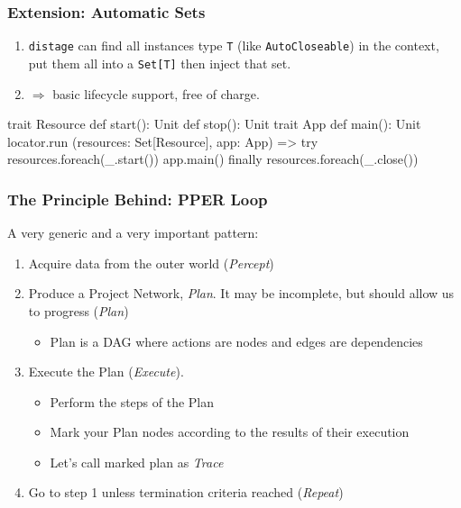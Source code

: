 \documentclass[usenames,dvipsnames]{beamer}
\newcommand{\distage}{\texttt{distage}\xspace}
\begin{document}
\begin{frame}[fragile]
\frametitle{Extension: Automatic Sets}

\begin{enumerate}
\item \distage can find all instances type \texttt{T} (like \texttt{AutoCloseable}) in the context,
put them all into a \texttt{Set[T]} then inject that set.
\item $\Rightarrow$ basic lifecycle support, free of charge.
\end{enumerate}

\begin{scalacode}
trait Resource {
  def start(): Unit
  def stop(): Unit
}
trait App { def main(): Unit }
locator.run { (resources: Set[Resource], app: App) =>
  try {
    resources.foreach(_.start())
    app.main()
  } finally {
    resources.foreach(_.close())
  }
}
\end{scalacode}
\end{frame}

\begin{frame}
    \frametitle{The Principle Behind: PPER Loop\footnotemark[1]}  
    
    A very generic and a very important pattern:
\begin{enumerate}
    \item Acquire data from the outer world (\textit{Percept})
    \item Produce a Project Network, \textit{Plan}. 
          It may be incomplete, but should allow us to progress (\textit{Plan})
          \begin{itemize}
            \item Plan is a DAG where actions are nodes and edges are dependencies       
          \end{itemize} 
    \item Execute the Plan (\textit{Execute}). 
    \begin{itemize}
        \item Perform the steps of the Plan
        \item Mark your Plan nodes according to the results of their execution    
        \item Let's call marked plan as \textit{Trace}
      \end{itemize} 
    \item Go to step 1 unless termination criteria reached (\textit{Repeat})
\end{enumerate}
\end{frame}
\end{document}
